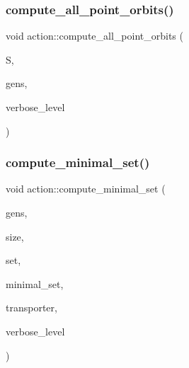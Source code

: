 \mbox{\label{classaction_a8fc64d7994aa7e5eee96eedf6be3215e}} 
\subsubsection{\texorpdfstring{compute\+\_\+all\+\_\+point\+\_\+orbits()}{compute\_all\_point\_orbits()}}
{\footnotesize\ttfamily void action\+::compute\+\_\+all\+\_\+point\+\_\+orbits (\begin{DoxyParamCaption}\item[{\mbox{\hyperlink{classschreier}{schreier}} \&}]{S,  }\item[{\mbox{\hyperlink{classvector__ge}{vector\+\_\+ge}} \&}]{gens,  }\item[{\mbox{\hyperlink{galois_8h_a09fddde158a3a20bd2dcadb609de11dc}{I\+NT}}}]{verbose\+\_\+level }\end{DoxyParamCaption})}

\mbox{\label{classaction_a51e79ebfadeae5fbe4ad5d65b1da501e}} 
\subsubsection{\texorpdfstring{compute\+\_\+minimal\+\_\+set()}{compute\_minimal\_set()}}
{\footnotesize\ttfamily void action\+::compute\+\_\+minimal\+\_\+set (\begin{DoxyParamCaption}\item[{\mbox{\hyperlink{classvector__ge}{vector\+\_\+ge}} \&}]{gens,  }\item[{\mbox{\hyperlink{galois_8h_a09fddde158a3a20bd2dcadb609de11dc}{I\+NT}}}]{size,  }\item[{\mbox{\hyperlink{galois_8h_a09fddde158a3a20bd2dcadb609de11dc}{I\+NT}} $\ast$}]{set,  }\item[{\mbox{\hyperlink{galois_8h_a09fddde158a3a20bd2dcadb609de11dc}{I\+NT}} $\ast$}]{minimal\+\_\+set,  }\item[{\mbox{\hyperlink{galois_8h_a09fddde158a3a20bd2dcadb609de11dc}{I\+NT}} $\ast$}]{transporter,  }\item[{\mbox{\hyperlink{galois_8h_a09fddde158a3a20bd2dcadb609de11dc}{I\+NT}}}]{verbose\+\_\+level }\end{DoxyParamCaption})}

